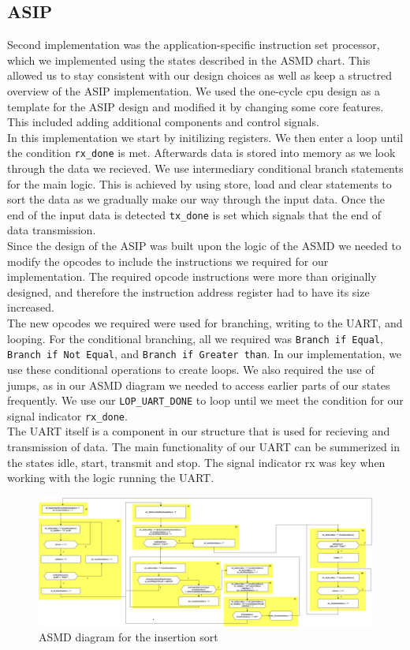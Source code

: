 \documentclass[conference]{IEEEtran}
\begin{document}
\subsection{ASIP}
Second implementation was the application-specific instruction set processor, which we implemented using the states described in the ASMD chart. This allowed us to stay consistent with our design choices as well as keep a structred overview of the ASIP implementation. We used the one-cycle cpu design as a template for the ASIP design and modified it by changing some core features. This included adding additional components and control signals.\\
In this implementation we start by initilizing registers. We then enter a loop until the condition \texttt{rx\_done} is met. Afterwards data is stored into memory as we look through the data we recieved. We use intermediary conditional branch statements for the main logic. This is achieved by using store, load and clear statements to sort the data as we gradually make our way through the input data. Once the end of the input data is detected \texttt{tx\_done} is set which signals that the end of data transmission.\\
Since the design of the ASIP was built upon the logic of the ASMD we needed to modify the opcodes to include the instructions we required for our implementation. The required opcode instructions were more than originally designed, and therefore the instruction address register had to have its size increased.\\
The  new opcodes we required were used for branching, writing to the UART, and looping. For the conditional branching, all we required was \texttt{Branch if Equal}, \texttt{Branch if Not Equal}, and \texttt{Branch if Greater than}. In our implementation, we use these conditional operations to create loops. We also required the use of jumps, as in our ASMD diagram we needed to access earlier parts of our states frequently. We use our \texttt{LOP\_UART\_DONE} to loop until we meet the condition for our signal indicator \texttt{rx\_done}.\\
The UART itself is a component in our structure that is used for recieving and transmission of data. The main functionality of our UART can be summerized in the states idle, start, transmit and stop. The signal indicator rx was key when working with the logic running the UART.

\begin{figure}
    \centering
    \includegraphics[width=1\linewidth]{Images/ASMDInsertionSort.png}
    \caption{ASMD diagram for the insertion sort}\label{fig:asmd}
\end{figure}
\end{document}
